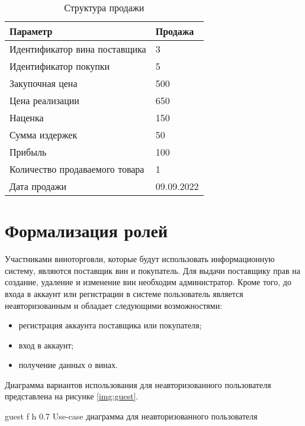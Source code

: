 \begin{table}[h]
    \caption{Структура продажи}
    \begin{center}
        \begin{tabular}{|l|l|}
            \hline
            \textbf{Параметр} & \textbf{Продажа} \\ \hline
            Идентификатор вина поставщика & 3 \\ \hline
            Идентификатор покупки & 5 \\ \hline
            Закупочная цена & 500 \\ \hline
            Цена реализации & 650 \\ \hline
            Наценка & 150 \\ \hline
            Сумма издержек & 50 \\ \hline
            Прибыль & 100 \\ \hline
            Количество продаваемого товара & 1 \\ \hline
            Дата продажи & 09.09.2022 \\ \hline
        \end{tabular}
    \end{center}
    \label{tab:sale_structure}
\end{table}

\section{Формализация ролей}

Участниками виноторговли, которые будут использовать информационную систему, являются поставщик вин и покупатель. Для выдачи поставщику прав на создание, удаление и изменение вин необходим администратор. Кроме того, до входа в аккаунт или регистрации в системе пользователь является неавторизованным и обладает следующими возможностями:

\begin{itemize}
	\item регистрация аккаунта поставщика или покупателя;
	\item вход в аккаунт;
	\item получение данных о винах.
\end{itemize}

Диаграмма вариантов использования для неавторизованного пользователя представлена на рисунке \ref{img:guest}.

    {guest}
    {f}
    {h}
    {0.7\textwidth}
    {Use-case диаграмма для неавторизованного пользователя}

